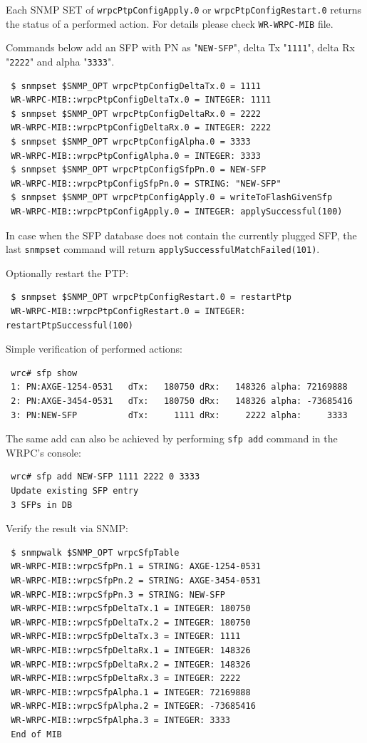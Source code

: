 \documentclass[a4paper, 12pt]{article}
\renewcommand{\_}{\underscore\allowbreak}
\begin{document}
Each SNMP SET of \texttt{wrpcPtpConfigApply.0} or \texttt{wrpcPtpConfigRestart.0} returns
the status of a performed action. For details please check \texttt{WR-WRPC-MIB}
file.

Commands below add an SFP with PN as "\texttt{NEW-SFP}", delta Tx "\texttt{1111}",
delta Rx "\texttt{2222}" and alpha "\texttt{3333}".
\begin{lstlisting}
 $ snmpset $SNMP_OPT wrpcPtpConfigDeltaTx.0 = 1111
 WR-WRPC-MIB::wrpcPtpConfigDeltaTx.0 = INTEGER: 1111
 $ snmpset $SNMP_OPT wrpcPtpConfigDeltaRx.0 = 2222
 WR-WRPC-MIB::wrpcPtpConfigDeltaRx.0 = INTEGER: 2222
 $ snmpset $SNMP_OPT wrpcPtpConfigAlpha.0 = 3333
 WR-WRPC-MIB::wrpcPtpConfigAlpha.0 = INTEGER: 3333
 $ snmpset $SNMP_OPT wrpcPtpConfigSfpPn.0 = NEW-SFP
 WR-WRPC-MIB::wrpcPtpConfigSfpPn.0 = STRING: "NEW-SFP"
 $ snmpset $SNMP_OPT wrpcPtpConfigApply.0 = writeToFlashGivenSfp
 WR-WRPC-MIB::wrpcPtpConfigApply.0 = INTEGER: applySuccessful(100)
\end{lstlisting}

In case when the SFP database does not contain the currently plugged SFP, the last
\texttt{snmpset} command will return \texttt{applySuccessfulMatchFailed(101)}.

Optionally restart the PTP:
\begin{lstlisting}
 $ snmpset $SNMP_OPT wrpcPtpConfigRestart.0 = restartPtp
 WR-WRPC-MIB::wrpcPtpConfigRestart.0 = INTEGER: restartPtpSuccessful(100)
\end{lstlisting}

Simple verification of performed actions:\\
\begin{minipage}{\textwidth}
\begin{lstlisting}
 wrc# sfp show
 1: PN:AXGE-1254-0531   dTx:   180750 dRx:   148326 alpha: 72169888
 2: PN:AXGE-3454-0531   dTx:   180750 dRx:   148326 alpha: -73685416
 3: PN:NEW-SFP          dTx:     1111 dRx:     2222 alpha:     3333
\end{lstlisting}
\end{minipage}

The same add can also be achieved by performing \texttt{sfp add} command in
the WRPC's console:
\begin{lstlisting}
 wrc# sfp add NEW-SFP 1111 2222 0 3333
 Update existing SFP entry
 3 SFPs in DB
\end{lstlisting}

Verify the result via SNMP:
\begin{lstlisting}
 $ snmpwalk $SNMP_OPT wrpcSfpTable
 WR-WRPC-MIB::wrpcSfpPn.1 = STRING: AXGE-1254-0531
 WR-WRPC-MIB::wrpcSfpPn.2 = STRING: AXGE-3454-0531
 WR-WRPC-MIB::wrpcSfpPn.3 = STRING: NEW-SFP
 WR-WRPC-MIB::wrpcSfpDeltaTx.1 = INTEGER: 180750
 WR-WRPC-MIB::wrpcSfpDeltaTx.2 = INTEGER: 180750
 WR-WRPC-MIB::wrpcSfpDeltaTx.3 = INTEGER: 1111
 WR-WRPC-MIB::wrpcSfpDeltaRx.1 = INTEGER: 148326
 WR-WRPC-MIB::wrpcSfpDeltaRx.2 = INTEGER: 148326
 WR-WRPC-MIB::wrpcSfpDeltaRx.3 = INTEGER: 2222
 WR-WRPC-MIB::wrpcSfpAlpha.1 = INTEGER: 72169888
 WR-WRPC-MIB::wrpcSfpAlpha.2 = INTEGER: -73685416
 WR-WRPC-MIB::wrpcSfpAlpha.3 = INTEGER: 3333
 End of MIB
\end{lstlisting}
\end{document}
